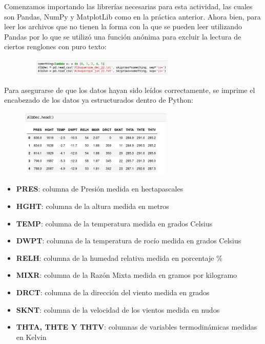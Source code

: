 \documentclass{article}
\begin{document}
Comenzamos importando las librerías necesarias para esta actividad, las cuales son Pandas, NumPy y MatplotLib como en la práctica anterior. Ahora bien, para leer los archivos que no tienen la forma con la que se pueden leer utilizando Pandas por lo que se utilizó una función anónima para excluir la lectura de ciertos renglones con puro texto:
\begin{figure}[h!]
\centering
\includegraphics[width=300px,height=32px]{1stInst.png}
\end{figure}

Para asegurarse de que los datos hayan sido leídos correctamente, se imprime el encabezado de los datos ya estructurados dentro de Python:
\begin{figure}[h!]
\centering
\includegraphics[width=277px,height=121px]{2ndInst.png}
\end{figure}
\begin{itemize}
\item \textbf{PRES}: columna de Presión medida en hectapascales
\item \textbf{HGHT}: columna de la altura medida en metros
\item \textbf{TEMP}: columna de la temperatura medida en grados Celsius
\item \textbf{DWPT}: columna de la temperatura de rocío medida en grados Celsius
\item \textbf{RELH}: columna de la humedad relativa medida en porcentaje \%
\item \textbf{MIXR}: columna de la Razón Mixta medida en gramos por kilogramo
\item \textbf{DRCT}: columna de la dirección del viento medida en grados
\item \textbf{SKNT}: columna de la velocidad de los vientos medida en nudos
\item \textbf{THTA, THTE Y THTV}: columnas de variables termodinámicas medidas en Kelvin
\end{itemize}
\end{document}
